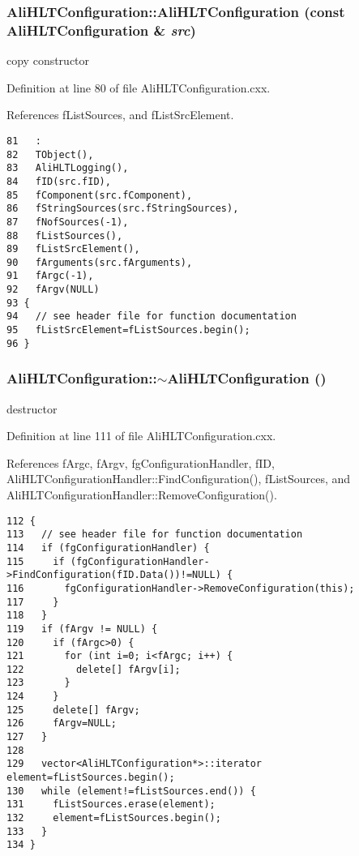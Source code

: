 \subsubsection{\setlength{\rightskip}{0pt plus 5cm}Ali\-HLTConfiguration::Ali\-HLTConfiguration (const {\bf Ali\-HLTConfiguration} \& {\em src})}\label{classAliHLTConfiguration_a2}


copy constructor 

Definition at line 80 of file Ali\-HLTConfiguration.cxx.

References f\-List\-Sources, and f\-List\-Src\-Element.

\footnotesize\begin{verbatim}81   :
82   TObject(),
83   AliHLTLogging(),
84   fID(src.fID),
85   fComponent(src.fComponent),
86   fStringSources(src.fStringSources),
87   fNofSources(-1),
88   fListSources(),
89   fListSrcElement(),
90   fArguments(src.fArguments),
91   fArgc(-1),
92   fArgv(NULL)
93 { 
94   // see header file for function documentation
95   fListSrcElement=fListSources.begin();
96 }

\end{verbatim}\normalsize 


\subsubsection{\setlength{\rightskip}{0pt plus 5cm}Ali\-HLTConfiguration::$\sim${\bf Ali\-HLTConfiguration} ()\hspace{0.3cm}{\tt  [virtual]}}\label{classAliHLTConfiguration_a4}


destructor 

Definition at line 111 of file Ali\-HLTConfiguration.cxx.

References f\-Argc, f\-Argv, fg\-Configuration\-Handler, f\-ID, Ali\-HLTConfiguration\-Handler::Find\-Configuration(), f\-List\-Sources, and Ali\-HLTConfiguration\-Handler::Remove\-Configuration().

\footnotesize\begin{verbatim}112 {
113   // see header file for function documentation
114   if (fgConfigurationHandler) {
115     if (fgConfigurationHandler->FindConfiguration(fID.Data())!=NULL) {
116       fgConfigurationHandler->RemoveConfiguration(this);
117     }
118   }
119   if (fArgv != NULL) {
120     if (fArgc>0) {
121       for (int i=0; i<fArgc; i++) {
122         delete[] fArgv[i];
123       }
124     }
125     delete[] fArgv;
126     fArgv=NULL;
127   }
128 
129   vector<AliHLTConfiguration*>::iterator element=fListSources.begin();
130   while (element!=fListSources.end()) {
131     fListSources.erase(element);
132     element=fListSources.begin();
133   }
134 }
\end{verbatim}\normalsize 




